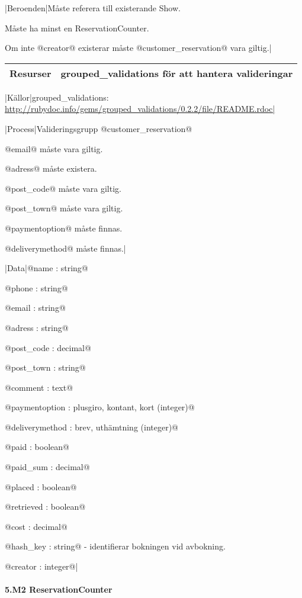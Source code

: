 \documentclass[a4paper, twoside, 11pt, titlepage]{article}
\begin{document}
			|Beroenden|Måste referera till existerande Show.

			Måste ha minst en ReservationCounter.

			Om inte @creator@ existerar måste @customer\_reservation@ vara giltig.|

			\begin {table} [ht] \begin{tabular} {  p{3.5cm} p{9.6cm} }
				\hline
				Resurser & grouped\_validations för att hantera valideringar  \\
				\hline
			\end{tabular} \end{table} \FloatBarrier
			\vspace{6mm}

			|Källor|grouped\_validations: \url{http://rubydoc.info/gems/grouped_validations/0.2.2/file/README.rdoc|}

			|Process|Valideringsgrupp @customer\_reservation@

			@email@ måste vara giltig.

			@adress@ måste existera.

			@post\_code@ måste vara giltig.

			@post\_town@ måste vara giltig.

			@paymentoption@ måste finnas.

			@deliverymethod@ måste finnas.|

			|Data|@name : string@

			@phone : string@

			@email : string@

			@adress : string@

			@post\_code : decimal@

			@post\_town : string@

			@comment : text@

			@paymentoption : {plusgiro, kontant, kort} (integer)@

			@deliverymethod : {brev, uthämtning} (integer)@

			@paid : boolean@

			@paid\_sum : decimal@

			@placed : boolean@

			@retrieved : boolean@

			@cost : decimal@

			@hash\_key : string@ - identifierar bokningen vid avbokning.

			@creator : integer@|

			\paragraph{5.M2 ReservationCounter}\
\end{document}
